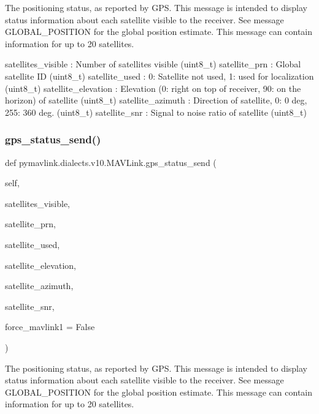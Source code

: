 \begin{DoxyVerb}
\begin{DoxyVerb}
\begin{DoxyVerb}The positioning status, as reported by GPS. This message is intended
to display status information about each satellite
visible to the receiver. See message GLOBAL_POSITION
for the global position estimate. This message can
contain information for up to 20 satellites.

satellites_visible        : Number of satellites visible (uint8_t)
satellite_prn             : Global satellite ID (uint8_t)
satellite_used            : 0: Satellite not used, 1: used for localization (uint8_t)
satellite_elevation        : Elevation (0: right on top of receiver, 90: on the horizon) of satellite (uint8_t)
satellite_azimuth         : Direction of satellite, 0: 0 deg, 255: 360 deg. (uint8_t)
satellite_snr             : Signal to noise ratio of satellite (uint8_t)\end{DoxyVerb}
 \mbox{\label{classpymavlink_1_1dialects_1_1v10_1_1MAVLink_ad019cee795d82995114c9a80b7f3aa0a}} 
\subsubsection{\texorpdfstring{gps\+\_\+status\+\_\+send()}{gps\_status\_send()}}
{\footnotesize\ttfamily def pymavlink.\+dialects.\+v10.\+M\+A\+V\+Link.\+gps\+\_\+status\+\_\+send (\begin{DoxyParamCaption}\item[{}]{self,  }\item[{}]{satellites\+\_\+visible,  }\item[{}]{satellite\+\_\+prn,  }\item[{}]{satellite\+\_\+used,  }\item[{}]{satellite\+\_\+elevation,  }\item[{}]{satellite\+\_\+azimuth,  }\item[{}]{satellite\+\_\+snr,  }\item[{}]{force\+\_\+mavlink1 = {\ttfamily False} }\end{DoxyParamCaption})}

\begin{DoxyVerb}The positioning status, as reported by GPS. This message is intended
to display status information about each satellite
visible to the receiver. See message GLOBAL_POSITION
for the global position estimate. This message can
contain information for up to 20 satellites.


\end{DoxyVerb}
\end{DoxyVerb}
\end{DoxyVerb}

